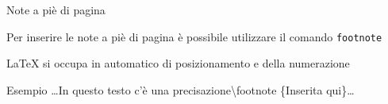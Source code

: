 \begin{frame}{Note a piè di pagina}

Per inserire le note a piè di pagina è possibile utilizzare il comando 
\texttt{footnote}

\vfill

\LaTeX{} si occupa in automatico di posizionamento e della numerazione

\vfill

\begin{exampleblock}{Esempio}
\dots{}In questo testo c'è una precisazione\textbackslash{}footnote
\{Inserita qui\}\dots{}
\end{exampleblock}

\end{frame}